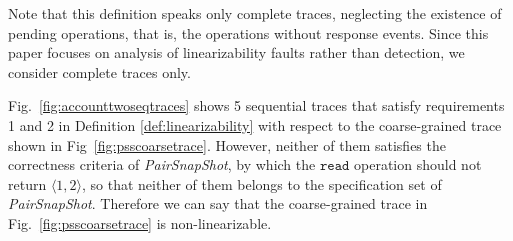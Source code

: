 \documentclass[runningheads]{llncs}
\newcommand{\pair}[1]{{\langle{#1}\rangle}}
\begin{document}
Note that this definition speaks only complete traces, neglecting the existence of pending operations, that is, the operations without response events. Since this paper focuses on analysis of linearizability faults rather than detection, we consider complete traces only.

\begin{example}
Fig.~\ref{fig:accounttwoseqtraces} shows 5 sequential traces that satisfy requirements 1 and 2 in Definition \ref{def:linearizability} with respect to the coarse-grained trace shown in Fig~\ref{fig:psscoarsetrace}. However, neither of them satisfies the correctness criteria of \textit{PairSnapShot}, by which the $\mathtt{read}$ operation should not return $\pair{1,2}$, so that neither of them belongs to the specification set of \textit{PairSnapShot}. Therefore we can say that the coarse-grained trace in Fig.~\ref{fig:psscoarsetrace} is non-linearizable.
\end{example}

\vspace{-0.5cm}
\end{document}
